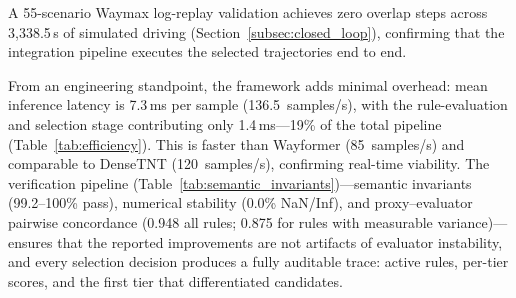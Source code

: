 A 55-scenario Waymax log-replay validation achieves zero overlap steps across 3{,}338.5\,s of simulated driving (Section~\ref{subsec:closed_loop}), confirming that the integration pipeline executes the selected trajectories end to end.

From an engineering standpoint, the framework adds minimal overhead: mean inference latency is 7.3\,ms per sample (136.5~samples/s), with the rule-evaluation and selection stage contributing only 1.4\,ms---19\% of the total pipeline (Table~\ref{tab:efficiency}).  This is faster than Wayformer (85~samples/s) and comparable to DenseTNT (120~samples/s), confirming real-time viability.  The verification pipeline (Table~\ref{tab:semantic_invariants})---semantic invariants (99.2--100\% pass), numerical stability (0.0\% NaN/Inf), and proxy--evaluator pairwise concordance (0.948 all rules; 0.875 for rules with measurable variance)---ensures that the reported improvements are not artifacts of evaluator instability, and every selection decision produces a fully auditable trace: active rules, per-tier scores, and the first tier that differentiated candidates.

